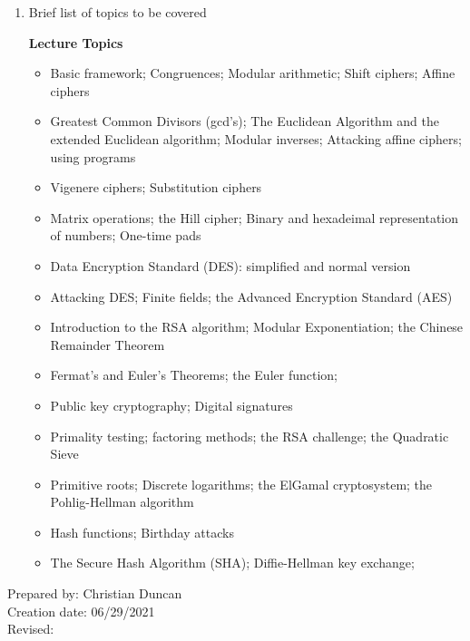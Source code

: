 \begin{enumerate}[1.]
\item Brief list of topics to be covered\\
  {\bfseries
    Lecture Topics
    \begin{itemize}
\item Basic framework; Congruences; Modular arithmetic; Shift ciphers; Affine ciphers
\item Greatest Common Divisors (gcd’s); The Euclidean Algorithm and the extended Euclidean algorithm; Modular inverses; Attacking affine ciphers; using programs
\item Vigenere ciphers; Substitution ciphers
\item Matrix operations; the Hill cipher; Binary and hexadeimal representation of numbers; One-time pads
\item Data Encryption Standard (DES): simplified and normal version
\item Attacking DES; Finite fields; the Advanced Encryption Standard (AES)
\item Introduction to the RSA algorithm; Modular Exponentiation; the Chinese Remainder Theorem
\item Fermat’s and Euler’s Theorems; the Euler function;
\item Public key cryptography; Digital signatures
\item Primality testing; factoring methods; the RSA challenge; the Quadratic Sieve
\item Primitive roots; Discrete logarithms; the ElGamal cryptosystem; the Pohlig-Hellman algorithm
\item Hash functions; Birthday attacks
\item The Secure Hash Algorithm (SHA); Diffie-Hellman key exchange;
\end{itemize}
}

\end{enumerate}

\noindent Prepared by: Christian Duncan\\
\noindent Creation date: 06/29/2021\\
\noindent Revised:\\
